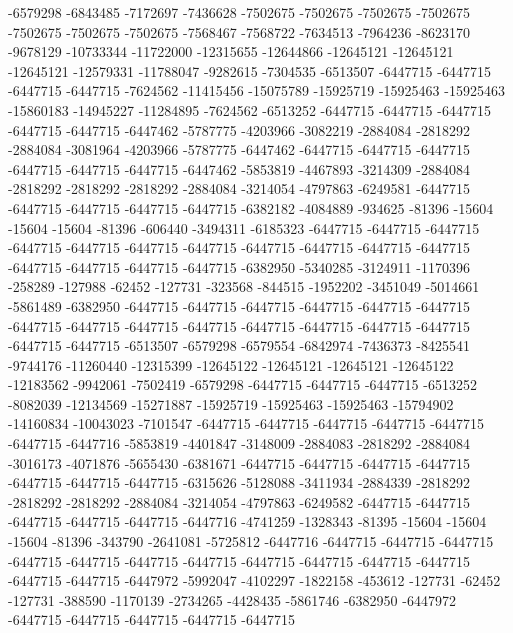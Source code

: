 -6579298 -6843485 -7172697 -7436628 -7502675 -7502675 -7502675 -7502675 -7502675 -7502675 -7502675 -7568467 -7568722 -7634513 -7964236 -8623170 -9678129 -10733344 -11722000 -12315655 -12644866 -12645121 -12645121 -12645121 -12579331 -11788047 -9282615 -7304535 -6513507 -6447715 -6447715 -6447715 -6447715 -7624562 -11415456 -15075789 -15925719 -15925463 -15925463 -15860183 -14945227 -11284895 -7624562 -6513252 -6447715 -6447715 -6447715 -6447715 -6447715 -6447462 -5787775 -4203966 -3082219 -2884084 -2818292 -2884084 -3081964 -4203966 -5787775 -6447462 -6447715 -6447715 -6447715 -6447715 -6447715 -6447715 -6447462 -5853819 -4467893 -3214309 -2884084 -2818292 -2818292 -2818292 -2884084 -3214054 -4797863 -6249581 -6447715 -6447715 -6447715 -6447715 -6447715 -6382182 -4084889 -934625 -81396 -15604 -15604 -15604 -81396 -606440 -3494311 -6185323 -6447715 -6447715 -6447715 -6447715 -6447715 -6447715 -6447715 -6447715 -6447715 -6447715 -6447715 -6447715 -6447715 -6447715 -6447715 -6382950 -5340285 -3124911 -1170396 -258289 -127988 -62452 -127731 -323568 -844515 -1952202 -3451049 -5014661 -5861489 -6382950 -6447715 -6447715 -6447715 -6447715
-6447715 -6447715 -6447715 -6447715 -6447715 -6447715 -6447715 -6447715 -6447715 -6447715 -6447715 -6447715 -6513507 -6579298 -6579554 -6842974 -7436373 -8425541 -9744176 -11260440 -12315399 -12645122 -12645121 -12645121 -12645122 -12183562 -9942061 -7502419 -6579298 -6447715 -6447715 -6447715 -6513252 -8082039 -12134569 -15271887 -15925719 -15925463 -15925463 -15794902 -14160834 -10043023 -7101547 -6447715 -6447715 -6447715 -6447715 -6447715 -6447715 -6447716 -5853819 -4401847 -3148009 -2884083 -2818292 -2884084 -3016173 -4071876 -5655430 -6381671 -6447715 -6447715 -6447715 -6447715 -6447715 -6447715 -6447715 -6315626 -5128088 -3411934 -2884339 -2818292 -2818292 -2818292 -2884084 -3214054 -4797863 -6249582 -6447715 -6447715 -6447715 -6447715 -6447715 -6447716 -4741259 -1328343 -81395 -15604 -15604 -15604 -81396 -343790 -2641081 -5725812 -6447716 -6447715 -6447715 -6447715 -6447715 -6447715 -6447715 -6447715 -6447715 -6447715 -6447715 -6447715 -6447715 -6447715 -6447972 -5992047 -4102297 -1822158 -453612 -127731 -62452 -127731 -388590 -1170139 -2734265 -4428435 -5861746 -6382950 -6447972 -6447715 -6447715 -6447715 -6447715 -6447715
